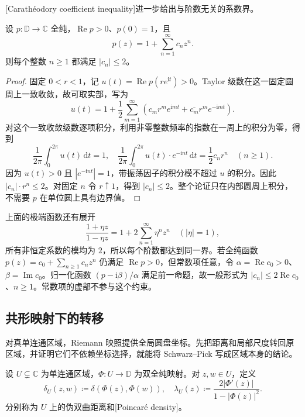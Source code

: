 [Carathéodory coefficient inequality]进一步给出与阶数无关的系数界。

\begin{proposition}\label{b3:prop:06-caratheodory-coefficients}
设 \(p:\mathbb D\rightarrow\mathbb C\) 全纯，\(\operatorname{Re}p>0\)、\(p(0)=1\)，且
\[
 p(z)=1+\sum_{n=1}^{\infty}c_nz^n.
\]
则每个整数 \(n\ge1\) 都满足 \(|c_n|\le2\)。
\end{proposition}
\begin{proof}
固定 \(0<r<1\)，记 \(u(t)=\operatorname{Re}p(re^{\mathrm{i}t})>0\)。Taylor 级数在这一固定圆周上一致收敛，故可取实部，写为
\[
 u(t)=1+\frac12\sum_{m=1}^{\infty}
 \left(c_mr^me^{\mathrm{i}mt}+\overline{c_m}r^me^{-\mathrm{i}mt}\right).
\]
对这个一致收敛级数逐项积分，利用非零整数频率的指数在一周上的积分为零，得到
\[
 \frac1{2\pi}\int_0^{2\pi}u(t)\,\mathrm{d}t=1,
 \quad
 \frac1{2\pi}\int_0^{2\pi}u(t)\cdot e^{-\mathrm{i}nt}\,\mathrm{d}t
 =\frac12c_nr^n\quad(n\ge1).
\]
因为 \(u(t)>0\) 且 \(|e^{-\mathrm{i}nt}|=1\)，带振荡因子的积分模不超过 \(u\) 的积分。因此 \(|c_n|\cdot r^n\le2\)。对固定 \(n\) 令 \(r\uparrow1\)，得到 \(|c_n|\le2\)。整个论证只在内部圆周上积分，不需要 \(p\) 在单位圆上具有边界值。
\end{proof}

上面的极端函数还有展开
\[
 \frac{1+\eta z}{1-\eta z}
 =1+2\sum_{n=1}^{\infty}\eta^nz^n\quad(|\eta|=1),
\]
所有非恒定系数的模均为 \(2\)，所以每个阶数都达到同一界。若全纯函数 \(p(z)=c_0+\sum_{n\ge1}c_nz^n\) 仍满足 \(\operatorname{Re}p>0\)，但常数项任意，令 \(\alpha=\operatorname{Re}c_0>0\)、\(\beta=\operatorname{Im}c_0\)。归一化函数 \((p-\mathrm{i}\beta)/\alpha\) 满足前一命题，故一般形式为 \(|c_n|\le2\operatorname{Re}c_0\)、\(n\ge1\)。常数项的虚部不参与这个约束。

\subsection{共形映射下的转移}
\label{b3:subsec:060304}

对真单连通区域，Riemann 映照提供全局圆盘坐标。先把距离和局部尺度转回原区域，并证明它们不依赖坐标选择，就能将 Schwarz--Pick 写成区域本身的结论。

\begin{definition}[区域上的距离与密度]\label{b3:def:06-conformal-transfer}
设 \(U\subsetneq\mathbb C\) 为单连通区域，\(\Phi:U\rightarrow\mathbb D\) 为双全纯映射。对 \(z,w\in U\)，定义
\[
 \delta_U(z,w)\coloneqq\delta(\Phi(z),\Phi(w)),
 \quad
 \lambda_U(z)\coloneqq\frac{2|\Phi'(z)|}{1-|\Phi(z)|^2}.
\]
分别称为 \(U\) 上的伪双曲距离和[Poincaré density]。
\end{definition}

